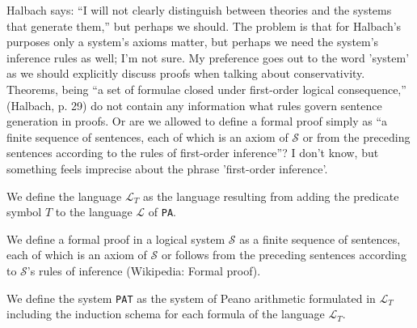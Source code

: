 %

Halbach says: ``I will not clearly distinguish between theories and the systems that generate them,'' but perhaps we should. The problem is that for Halbach's purposes only a system's axioms matter, but perhaps we need the system's inference rules as well; I'm not sure. My preference goes out to the word 'system' as we should explicitly discuss proofs when talking about conservativity. Theorems, being ``a set of formulae closed under first-order logical consequence,'' (Halbach, p. 29) do not contain any information what rules govern sentence generation in proofs. Or are we allowed to define a formal proof simply as ``a finite sequence of sentences, each of which is an axiom of $\mathcal{S}$ or from the preceding sentences according to the rules of first-order inference''? I don't know, but something feels imprecise about the phrase 'first-order inference'.

\begin{definition}[$\mathcal{L}_T$]
    \label{def:LT}
    We define the language $\mathcal{L}_T$ as the language resulting from adding the predicate symbol $T$ to the language $\mathcal{L}$ of \texttt{PA}. 
\end{definition}

\begin{definition}
    \label{def:formal-proof}
    We define a formal proof in a logical system $\mathcal{S}$ as a finite sequence of sentences, each of which is an axiom of $\mathcal{S}$ or follows from the preceding sentences according to $\mathcal{S}$'s rules of inference (Wikipedia: Formal proof).
\end{definition}

\begin{definition}
    \label{def:PAT}
    We define the system \texttt{PAT} as the system of Peano arithmetic formulated in $\mathcal{L}_T$ including the induction schema for each formula of the language $\mathcal{L}_T$.
\end{definition}


